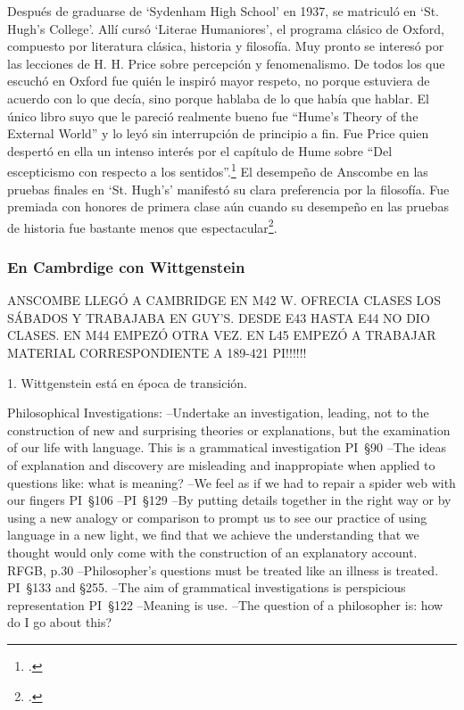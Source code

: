   Después de graduarse de `Sydenham High School' en 1937, se matriculó en `St.
  Hugh's College'. Allí cursó `Literae Humaniores', el programa clásico de Oxford,
  compuesto por literatura clásica, historia y filosofía. Muy pronto se interesó
  por las lecciones de H. H. Price sobre percepción y fenomenalismo. De todos los
  que escuchó en Oxford fue quién le inspiró mayor respeto, no porque estuviera de
  acuerdo con lo que decía, sino porque hablaba de lo que había que hablar. El
  único libro suyo que le pareció realmente bueno fue ``Hume's Theory of the
  External World'' y lo leyó sin interrupción de principio a
  fin. Fue Price quien despertó en ella un intenso interés por el capítulo de Hume
  sobre ``Del escepticismo con respecto a los sentidos''.\footcite[cf.~][p.~viii
  \S1]{M&PotM} El desempeño de Anscombe en las pruebas finales en `St. Hugh's'
  manifestó su clara preferencia por la filosofía. Fue premiada con honores de
  primera clase aún cuando su desempeño en las pruebas de historia fue bastante
  menos que espectacular\footcite[p.~3~\S1]{teichmann}.

  \subsubsection{En Cambrdige con Wittgenstein}
  ANSCOMBE LLEGÓ A CAMBRIDGE EN M42 W. OFRECIA CLASES LOS SÁBADOS Y TRABAJABA EN
  GUY'S. DESDE E43 HASTA E44 NO DIO CLASES. EN M44 EMPEZÓ OTRA VEZ. EN L45 EMPEZÓ
  A TRABAJAR MATERIAL CORRESPONDIENTE A 189-421 PI!!!!!!

  1. Wittgenstein está en época de transición.
  \begin{revision}
  Philosophical Investigations:
  --Undertake an investigation, leading, not to the construction of new and
  surprising theories or explanations, but the examination of our life with
  language. This is a grammatical investigation PI~\S90 
  --The ideas of explanation and discovery are misleading and inappropiate when
  applied to questions like: what is meaning?
  --We feel as if we had to repair a spider web with our fingers PI~\S106
  --PI~\S129
  --By putting details together in the right way or by using a new analogy or
  comparison to prompt us to see our practice of using language in a new light, we
  find that we achieve the understanding that we thought would only come with the
  construction of an explanatory account. RFGB, p.30
  --Philosopher's questions must be treated like an illness is treated. PI~\S133
  and \S255.
  --The aim of grammatical investigations is perspicious representation PI~\S122
  --Meaning is use.
  --The question of a philosopher is: how do I go about this?
  \end{revision}


